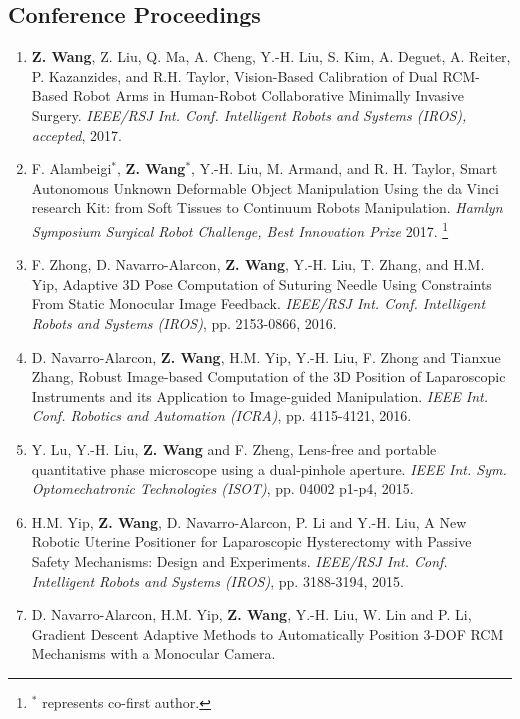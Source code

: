 \documentclass[10pt,letterpaper]{article}
\begin{document}
    \subsection*{Conference Proceedings}
    \begin{enumerate}
        \item \textbf{Z. Wang}, Z. Liu, Q. Ma, A. Cheng, Y.-H. Liu, S. Kim, A. Deguet, A. Reiter, P. Kazanzides, and R.H. Taylor,
        Vision-Based Calibration of Dual RCM-Based Robot Arms in Human-Robot Collaborative Minimally Invasive Surgery.
        \textit{{IEEE/RSJ} Int. Conf. Intelligent Robots and Systems (IROS), accepted}, 2017.
        \item F. Alambeigi$^*$, \textbf{Z. Wang}$^*$, Y.-H. Liu, M. Armand, and R. H. Taylor,
        Smart Autonomous Unknown Deformable Object Manipulation Using the da Vinci research Kit: from Soft Tissues to Continuum Robots Manipulation.
        \textit{Hamlyn Symposium Surgical Robot Challenge, Best Innovation Prize} 2017.
        \let\thefootnote\relax\footnote{$^*$ represents co-first author.}
        \item F. Zhong, D. Navarro-Alarcon, \textbf{Z. Wang}, Y.-H. Liu, T. Zhang, and H.M. Yip,
        Adaptive 3D Pose Computation of Suturing Needle Using Constraints From Static Monocular Image Feedback.
        \textit{{IEEE/RSJ} Int. Conf. Intelligent Robots and Systems (IROS)}, pp. 2153-0866, 2016.
        \item D. Navarro-Alarcon, \textbf{Z. Wang}, H.M. Yip, Y.-H. Liu, F. Zhong and Tianxue Zhang,
        Robust Image-based Computation of the 3D Position of Laparoscopic Instruments and its Application to Image-guided Manipulation.
        \textit{{IEEE} Int. Conf. Robotics and Automation (ICRA)}, pp. 4115-4121, 2016.
        \item Y. Lu, Y.-H. Liu, \textbf{Z. Wang} and F. Zheng,
        Lens-free and portable quantitative phase microscope using a dual-pinhole aperture.
        \textit{{IEEE} Int. Sym. Optomechatronic Technologies (ISOT)}, pp. 04002 p1-p4, 2015.
        \item H.M. Yip, \textbf{Z. Wang}, D. Navarro-Alarcon, P. Li and Y.-H. Liu,
        A New Robotic Uterine Positioner for Laparoscopic Hysterectomy with Passive Safety Mechanisms: Design and Experiments.
        \textit{{IEEE/RSJ} Int. Conf. Intelligent Robots and Systems (IROS)}, pp. 3188-3194, 2015.
        \item D. Navarro-Alarcon, H.M. Yip, \textbf{Z. Wang}, Y.-H. Liu, W. Lin and P. Li,
        Gradient Descent Adaptive Methods to Automatically Position 3-DOF RCM Mechanisms with a Monocular Camera.

\end{enumerate}
\end{document}
